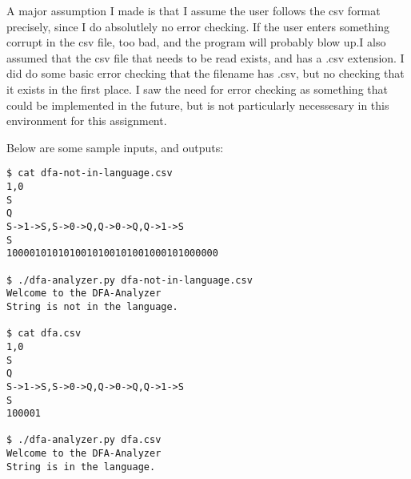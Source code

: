 \documentclass{article}
\begin{document}
A major assumption I made is that I assume the user follows the csv format precisely, since I do absolutlely no error checking. If the user enters something corrupt in the csv file, too bad, and the program will probably blow up.I also assumed that the csv file that needs to be read exists, and has a .csv extension. I did do some basic error checking that the filename has .csv, but no checking that it exists in the first place. I saw the need for error checking as something that could be implemented in the future, but is not particularly necessesary in this environment for this assignment.

Below are some sample inputs, and outputs:

\begin{lstlisting}
$ cat dfa-not-in-language.csv 
1,0
S
Q
S->1->S,S->0->Q,Q->0->Q,Q->1->S
S
1000010101010010100101001000101000000

$ ./dfa-analyzer.py dfa-not-in-language.csv 
Welcome to the DFA-Analyzer
String is not in the language.

$ cat dfa.csv
1,0
S
Q
S->1->S,S->0->Q,Q->0->Q,Q->1->S
S
100001

$ ./dfa-analyzer.py dfa.csv
Welcome to the DFA-Analyzer
String is in the language.
\end{lstlisting}
\end{document}
